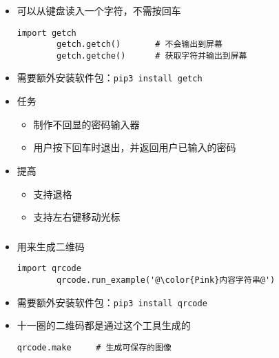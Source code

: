 \begin{frame} [fragile]
	\frametitle{}
	\linespread{1.25}
	\begin{itemize}
	\item {}可以从键盘读入一个字符，不需按回车
		\begin{lstlisting}[style=pythonstyle, gobble=8, texcl, escapechar=@]
		import getch
		getch.getch()		# 不会输出到屏幕
		getch.getche()		# 获取字符并输出到屏幕
		\end{lstlisting}
	\item 需要额外安装软件包：\texttt{pip3 install getch}
	\item 任务
		\begin{itemize}
		\item 制作不回显的密码输入器
		\item 用户按下回车时退出，并返回用户已输入的密码
		\end{itemize}
	\item 提高
		\begin{itemize}
		\item 支持退格
		\item 支持左右键移动光标
		\end{itemize}
	\end{itemize}
\begin{comment}
import getch
def getpass() :
	l, r = '', ''
	while True :
		c = getch.getch()
		if c == '\n' :
			return l + r
		elif c == '\x7f' :
			l = l[:-1]
		elif c == '\x1b' :	# Backspace
			assert getch.getch() == '['
			c = getch.getch()
			if c == 'C' :	# Right
				if r :
					l += r[0]
					r = r[1:]
			elif c == 'D' :	# Left
				if l :
					r = l[-1] + r
					l = l[:-1]
			elif c == '3' :	# Delete
				assert getch.getch() == '~'
				r = r[1:]
		else :
			l += c
\end{comment}
\end{frame}

\begin{frame} [fragile]
	\frametitle{}
	\linespread{1.5}
	\begin{itemize}
	\item {}用来生成二维码
		\begin{lstlisting}[style=pythonstyle, gobble=8, texcl, escapechar=@]
		import qrcode
		qrcode.run_example('@\color{Pink}内容字符串@')
		\end{lstlisting}
	\item 需要额外安装软件包：\texttt{pip3 install qrcode}
	\item 十一圈的二维码都是通过这个工具生成的
		\begin{lstlisting}[style=pythonstyle, gobble=8, texcl]
		qrcode.make		# 生成可保存的图像
		\end{lstlisting}
	\end{itemize}
\end{frame}

